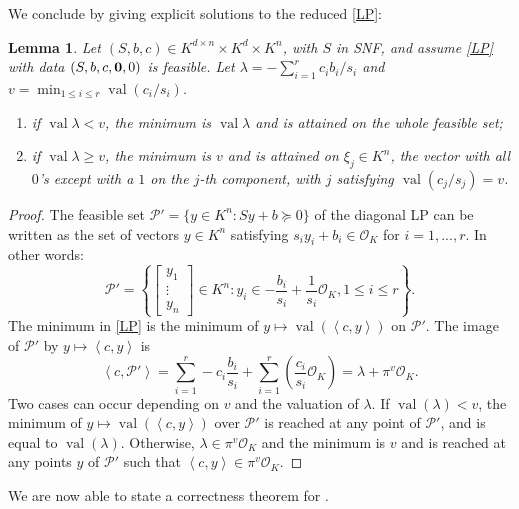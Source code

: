 \documentclass{elsarticle}
\theoremstyle{plain}
\newtheorem{lemma}[theorem]{Lemma}
\theoremstyle{definition}
\newcommand{\PP}{\mathcal{P}}
\DeclareMathOperator{\val}{val}
\newcommand{\OK}{\mathcal{O}_K}
\begin{document}
We conclude by giving explicit solutions to the reduced \eqref{LP}:

\begin{lemma}\label{solutions}
  Let $(S,b,c) \in K^{d\times n} \times K^d \times K^n$, with $S$ in SNF,
  and assume \eqref{LP} with data $(S,b,c,{\bf 0},0)$ is feasible.
  Let $\lambda = -\sum_{i=1}^r c_i b_i/s_i$ and $v = \min_{1\le i\le r} \val (c_i/s_i)$.
  \begin{enumerate}
  \item
    if $\val \lambda < v$, the minimum is $\val \lambda$ and is attained on the whole feasible
    set; \label{solutions:it1}
  \item
    if $\val \lambda \geq v$, the minimum is $v$ and is attained on
    $\xi_j \in K^n$, the vector with all $0$'s except with a $1$ on the $j$-th component,
    with $j$ satisfying $\val (c_j/s_j) = v$. \label{solutions:it2}
  \end{enumerate}
\end{lemma}
\begin{proof}
  The feasible set $\PP' = \{y \in K^n : Sy+b \succeq 0\}$ of the diagonal LP can be written
  as the set of vectors $y \in K^n$ satisfying $s_i y_i + b_i \in \OK$ for $i=1,...,r$.
  In other words:
  $$
  \PP' = \left\{\left[\begin{smallmatrix} y_1\\ \vdots\\ y_n \end{smallmatrix}\right] \in K^n :
  y_i \in -\frac{b_i}{s_i} + \frac{1}{s_i} \OK, 1\le i\le r\right\}.
  $$
  The minimum in \eqref{LP} is the minimum of
  $y \mapsto \val\left(\left\langle c,y \right\rangle\right)$ on $\PP'$.
  The image of $\PP'$ by $y \mapsto \left\langle c,y \right\rangle$ is
  \[
  \left\langle c,\PP' \right\rangle = \sum_{i=1}^r -c_i \frac{b_i}{s_i} +
  \sum_{i=1}^r\left( \frac{c_i}{s_{i}} \OK \right) = \lambda + \pi^{v} \OK.
  \]
  Two cases can occur depending on $v$ and the valuation of $\lambda$.
  If $\val(\lambda) < v$, the minimum of $y\mapsto \val\left(\left\langle c,y \right\rangle\right)$
  over $\PP'$ is reached at any point of $\PP'$, and is equal to $\val(\lambda)$.
  Otherwise, $\lambda \in \pi^{v} \OK$ and the minimum is $v$ and is reached at any points $y$ of $\PP'$ such that
  $\left\langle c,y \right\rangle \in \pi^v\OK$.
\end{proof}

We are now able to state a correctness theorem for .
  
\end{document}
